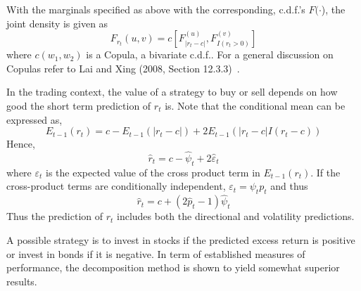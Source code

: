 With the marginals specified as above with the corresponding, c.d.f.'s $F(\cdot$), the joint density is given as
	\begin{equation}\label{eqn:frt}
	F_{r_t}(u,v) = c [F_{|r_t-c|}^{(u)}, F_{I(r_t>0)}^{(v)}]
	\end{equation}
where $c(w_1,w_2)$ is a Copula, a bivariate c.d.f.. For a general discussion on Copulas refer to Lai and Xing (2008, Section 12.3.3)~\cite{lai1}.


In the trading context, the value of a strategy to buy or sell depends on how good the short term prediction of $r_{t}$ is. Note that the conditional mean can be expressed as,
	\[
	E_{t-1}(r_t) = c - E_{t-1}(\left|r_t - c\right|) + 2E_{t-1}(\left|r_t - c\right| I(r_t - c))
	\]
Hence,
	\begin{equation}\label{eqn:hatrt}
	\hat{r}_{t} = c - \hat{\psi}_{t} + 2\hat{\varepsilon}_t
	\end{equation}
where $\varepsilon_t$ is the expected value of the cross product term in $E_{t-1}(r_t)$. If the cross-product terms are conditionally independent, $\varepsilon_t = \psi_t p_t$ and thus
	\begin{equation}\label{eqn:hatrt2}
	\hat{r}_t = c + (2\hat{p}_t - 1)\hat{\psi}_t
	\end{equation}
Thus the prediction of $r_{t}$ includes both the directional and volatility predictions.


A possible strategy is to invest in stocks if the predicted excess return is positive or invest in bonds if it is negative. In term of established measures of performance, the decomposition method is shown to yield somewhat superior results. \\


